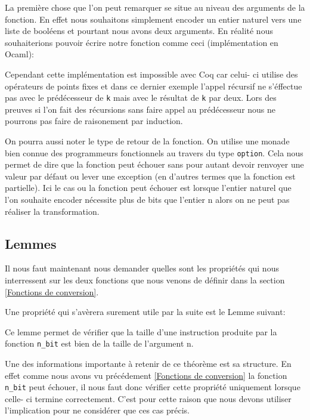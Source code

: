 \documentclass {article}
\newcommand{\codefrom}[3]
           {}
\newcommand{\codefromOcaml}[3]
           {}
\theoremstyle{definition}
\theoremstyle{remark}
\newcommand{\fun}[1]{\lstinline!#1!}
\begin{document}
La première chose que l'on peut remarquer se situe au niveau des arguments de
la fonction. En effet nous souhaitons simplement encoder un entier naturel vers
une liste de booléens et pourtant nous avons deux arguments.
En réalité nous souhaiterions pouvoir écrire notre fonction comme ceci
(implémentation en Ocaml):
\codefromOcaml{rapport}{example}{nbit}

Cependant cette implémentation est impossible avec Coq car celui- ci utilise
des opérateurs de points fixes et dans ce dernier exemple l'appel récursif ne s'éffectue
pas avec le prédécesseur de \fun{k}  mais avec le
résultat de \fun{k} par deux. Lors des preuves si l'on fait des récursions sans faire appel
au prédécesseur nous ne pourrons pas faire de raisonement par induction. 


On pourra aussi noter le type de retour de la fonction.
On utilise une monade bien connue des programmeurs fonctionnels au travers du type
\fun{option}. Cela nous permet de
dire que la fonction peut échouer sans pour autant devoir renvoyer une valeur par
défaut ou lever une exception (en d'autres termes que la fonction est partielle). Ici le cas ou la fonction peut échouer est lorsque
l'entier naturel que l'on souhaite encoder nécessite plus de bits que l'entier n alors
on ne peut pas réaliser la transformation.





\subsection{Lemmes}
\label{lemmes bits}

Il nous faut maintenant nous demander quelles sont les propriétés qui nous interressent sur
les deux fonctions que nous venons de définir dans la section \ref{Fonctions de conversion}.

Une propriété qui s'avèrera surement utile par la suite est le Lemme suivant:

\codefrom{src}{binary}{size_n_bit}

Ce lemme permet de vérifier que la taille d'une instruction produite par
la fonction \fun{n_bit} est bien de la taille de l'argument n.


Une des informations importante à retenir de ce théorème est sa structure.
En effet comme nous avons vu précédement \ref{Fonctions de conversion} la
fonction \fun{n_bit} peut échouer, il nous faut donc vérifier cette propriété
uniquement lorsque celle- ci termine correctement. C'est pour cette raison
que nous devons utiliser l'implication pour ne considérer que ces cas précis. \\
\end{document}
